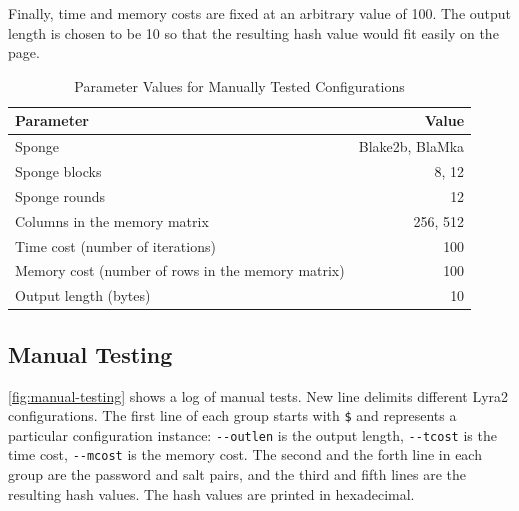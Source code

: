 Finally, time and memory costs are fixed at an arbitrary value of 100. The output length is chosen to be 10 so that the resulting hash value would fit easily on the page.

\begin{table}
    \begin{center}
        \begin{tabular}{l r}
            Parameter & Value \\ \hline
            Sponge & Blake2b, BlaMka \\
            Sponge blocks & 8, 12 \\
            Sponge rounds & 12 \\
            Columns in the memory matrix & 256, 512 \\
            Time cost (number of iterations) & 100 \\
            Memory cost (number of rows in the memory matrix) & 100 \\
            Output length (bytes) & 10 \\
        \end{tabular}
    \end{center}
    \caption{Parameter Values for Manually Tested Configurations}
    \label{table:configuration-summary}
\end{table}

\subsection{Manual Testing}
\label{sec:manual-testing}

\autoref{fig:manual-testing} shows a log of manual tests. New line delimits different Lyra2 configurations. The first line of each group starts with \texttt{\$} and represents a particular configuration instance: \verb|--outlen| is the output length, \verb|--tcost| is the time cost, \verb|--mcost| is the memory cost. The second and the forth line in each group are the password and salt pairs, and the third and fifth lines are the resulting hash values. The hash values are printed in hexadecimal.

